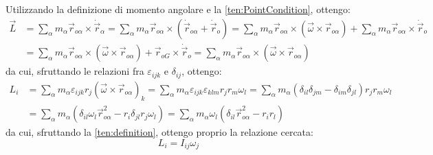 \documentclass[../main.tex]{subfiles}
\begin{document}
Utilizzando la definizione di momento angolare e la \cref{ten:PointCondition}, ottengo:
\begin{equation*}
	\begin{split}
	\vec L	& =\sum_{\alpha} m_\alpha \vec r_{o\alpha}\times \dot{\vec r}_{\alpha}=\sum_{\alpha} m_\alpha \vec r_{o\alpha}\times (\dot{\vec r}_{o\alpha}+\dot{\vec r}_o)=\sum_{\alpha} m_\alpha \vec r_{o\alpha}\times (\vec\omega\times\vec r_{o\alpha})+\sum_{\alpha} m_\alpha \vec r_{o\alpha}\times \dot{\vec r}_o\\
			& =\sum_{\alpha} m_\alpha \vec r_{o\alpha}\times (\vec\omega\times\vec r_{o\alpha})+\vec r_{oG}\times \dot{\vec r}_o=\sum_{\alpha} m_\alpha \vec r_{o\alpha}\times (\vec\omega\times\vec r_{o\alpha})
	\end{split}
\end{equation*}
da cui, sfruttando le relazioni fra $\varepsilon_{ijk}$ e $\delta_{ij}$, ottengo:
\begin{equation*}
	\begin{split}
		L_i & =\sum_\alpha m_\alpha \varepsilon_{ijk}r_j(\vec\omega\times\vec{r}_{o\alpha})_k = \sum_\alpha m_\alpha \varepsilon_{ijk} \varepsilon_{klm} r_j r_m\omega_l =\sum_\alpha m_\alpha (\delta_{il}\delta_{jm}-\delta_{im}\delta_{jl}) r_j r_m\omega_l \\
			& =\sum_\alpha m_\alpha (\delta_{il}\omega_l\vec r_{o\alpha}^2 -r_i\delta_{jl} r_j\omega_l)=\sum_\alpha m_\alpha \omega_l(\delta_{il}\vec r_{o\alpha}^2 -r_ir_l)
	\end{split}
\end{equation*}
da cui, sfruttando la \cref{ten:definition}, ottengo proprio la relazione cercata:
\begin{equation}\label{ten:MomentoAngolare}
	L_i=I_{ij}\omega_j
\end{equation}
\end{document}
